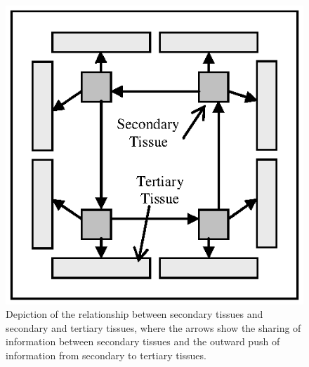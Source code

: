\begin{figure}[ht]
	\centering
	\includegraphics[scale=0.75]{Tissues/tissues-architecture-maturation}
	\caption{Depiction of the relationship between secondary tissues and secondary and tertiary tissues, where the arrows show the sharing of information between secondary tissues and the outward push of information from secondary to tertiary tissues.}
	\label{pic:tissues:architecture:maturation}
\end{figure}

%
%

